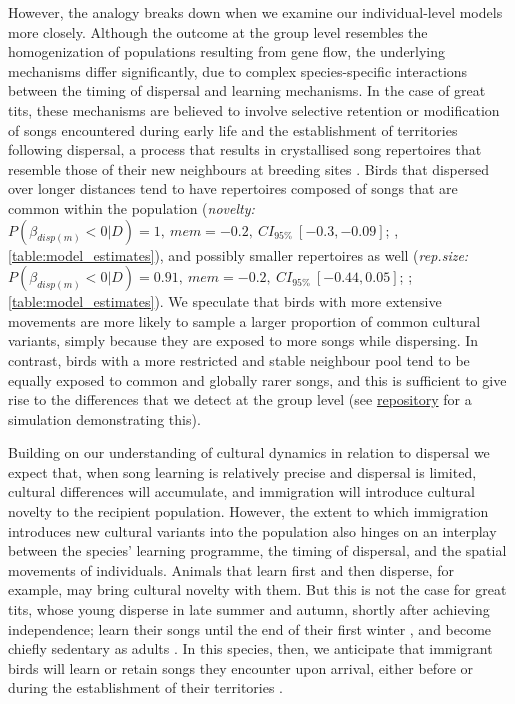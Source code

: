 \documentclass[9pt, twocolumn, twoside]{gsajnl}
\begin{document}
However, the analogy breaks down when we examine our individual-level models more closely. Although the outcome at the group level resembles the homogenization of populations resulting from gene flow, the underlying mechanisms differ significantly, due to complex species-specific interactions between the timing of dispersal and learning mechanisms. In the case of great tits, these mechanisms are believed to involve selective retention or modification of songs encountered during early life and the establishment of territories following dispersal, a process that results in crystallised song repertoires that resemble those of their new neighbours at breeding sites \parencite{marler1982, peters2017, nelson1992}. Birds that dispersed over longer distances tend to have repertoires composed of songs that are common within the population (\textit{novelty:} $P(\beta_{disp (m)} < 0 | D) = 1,~mem = -0.2,~CI_{95\%}~[-0.3, -0.09]$; , \autoref{table:model_estimates}), and possibly smaller repertoires as well (\textit{rep.size:} $P(\beta_{disp (m)} < 0 | D) = 0.91,~mem = -0.2,~CI_{95\%}~[-0.44, 0.05]$; ; \autoref{table:model_estimates}). We speculate that birds with more extensive movements are more likely to sample a larger proportion of common cultural variants, simply because they are exposed to more songs while dispersing. In contrast, birds with a more restricted and stable neighbour pool tend to be equally exposed to common and globally rarer songs, and this is sufficient to give rise to the differences that we detect at the group level (see \href{https://github.com/nilomr/birdsong-demography/blob/main/scripts/models/report/frequency-dispersal-sim.py}{repository} for a simulation demonstrating this).

Building on our understanding of cultural dynamics in relation to dispersal we expect that, when song learning is relatively precise and dispersal is limited, cultural differences will accumulate, and immigration will introduce cultural novelty to the recipient population. However, the extent to which immigration introduces new cultural variants into the population also hinges on an interplay between the species' learning programme, the timing of dispersal, and the spatial movements of individuals. Animals that learn first and then disperse, for example, may bring cultural novelty with them. But this is not the case for great tits, whose young disperse in late summer and autumn, shortly after achieving independence; learn their songs until the end of their first winter \parencite{rivera-gutierrez2011}, and become chiefly sedentary as adults \parencite{greenwood1979, dhondt1979, dingemanse2003}. In this species, then, we anticipate that immigrant birds will learn or retain songs they encounter upon arrival, either before or during the establishment of their territories \parencite{keen2020, graham2018}.
\end{document}
